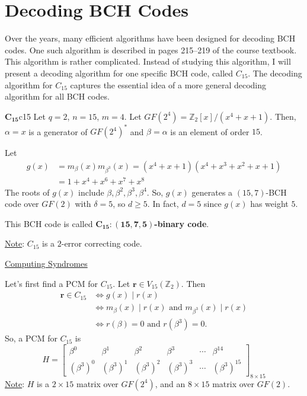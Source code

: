 \section{Decoding BCH Codes}
Over the years, many efficient algorithms have been designed for decoding
BCH codes. One such algorithm is described in pages 215--219 of the
course textbook. This algorithm is rather complicated. Instead of studying
this algorithm, I will present a decoding algorithm for one specific
BCH code, called $ C_{15} $. The decoding algorithm for $ C_{15} $
captures the essential idea of a more general decoding algorithm for all
BCH codes.


\begin{Definition}{$ \symbf{C_{15}} $}{c15}
    Let $ q=2 $, $ n=15 $, $ m=4 $. Let $ GF(2^4)=\mathbb{Z}_2[x]/(x^4+x+1) $.
    Then, $ \alpha=x $ is a generator of $ GF(2^4)^* $ and $ \beta=\alpha $
    is an element of order $ 15 $.

    Let
    \begin{align*}
        g(x)
         & =m_{\beta}(x)m_{\beta^3}(x)=(x^4+x+1)(x^4+x^3+x^2+x+1) \\
         & =1+x^4+x^6+x^7+x^8
    \end{align*}
    The roots of $ g(x) $ include $ \beta,\beta^2,\beta^3,\beta^4 $. So,
    $ g(x) $ generates a $ (15,7) $-BCH code over $ GF(2) $
    with $ \delta=5 $, so $ d\geqslant 5 $. In fact, $ d=5 $
    since $ g(x) $ has weight $ 5 $.

    This BCH code is called \textbf{$ \symbf{C_{15}:(15,7,5)} $-binary code}.

    \underline{Note}: $ C_{15} $ is a $ 2 $-error correcting code.
\end{Definition}


\underline{Computing Syndromes}

Let's first find a PCM for $ C_{15} $. Let $ \symbf{r}\in V_{15}(\mathbb{Z}_2) $.
Then
\begin{align*}
    \symbf{r}\in C_{15}
     & \iff g(x)\mid r(x)                                            \\
     & \iff m_{\beta}(x)\mid r(x)\text{ and }m_{\beta^3}(x)\mid r(x) \\
     & \iff r(\beta)=0\text{ and } r(\beta^3)=0.
\end{align*}
So, a PCM for $ C_{15} $ is
\[ H=
    \begin{bmatrix}
        \beta^0     & \beta^1     & \beta^2     & \beta^3     & \cdots & \beta^{14}     \\
        (\beta^3)^0 & (\beta^3)^1 & (\beta^3)^2 & (\beta^3)^3 & \cdots & (\beta^3)^{15}
    \end{bmatrix}_{8\times 15} \]
\underline{Note}: $ H $ is a $ 2\times 15 $ matrix over $ GF(2^4) $,
and an $ 8\times 15 $ matrix over $ GF(2) $.

